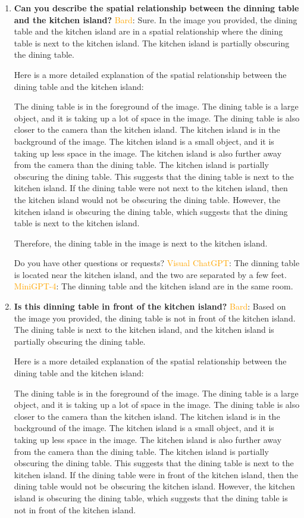 \begin{enumerate}
    \item \textbf{Can you describe the spatial relationship between the dinning table and the kitchen island?}
    \subitem \textcolor{orange}{Bard}: 
    Sure. In the image you provided, the dining table and the kitchen island are in a spatial relationship where the dining table is next to the kitchen island. The kitchen island is partially obscuring the dining table.
    
    Here is a more detailed explanation of the spatial relationship between the dining table and the kitchen island:
    
    The dining table is in the foreground of the image. The dining table is a large object, and it is taking up a lot of space in the image. The dining table is also closer to the camera than the kitchen island.
    The kitchen island is in the background of the image. The kitchen island is a small object, and it is taking up less space in the image. The kitchen island is also further away from the camera than the dining table.
    The kitchen island is partially obscuring the dining table. This suggests that the dining table is next to the kitchen island.
    If the dining table were not next to the kitchen island, then the kitchen island would not be obscuring the dining table. However, the kitchen island is obscuring the dining table, which suggests that the dining table is next to the kitchen island.
    
    Therefore, the dining table in the image is next to the kitchen island.
    
    Do you have other questions or requests?
    \subitem \textcolor{orange}{Visual ChatGPT}: The dinning table is located near the kitchen island, and the two are separated by a few feet.
    \subitem \textcolor{orange}{MiniGPT-4}: The dinning table and the kitchen island are in the same room.
    \item \textbf{Is this dinning table in front of the kitchen island?}
    \subitem \textcolor{orange}{Bard}: Based on the image you provided, the dining table is not in front of the kitchen island. The dining table is next to the kitchen island, and the kitchen island is partially obscuring the dining table.

    Here is a more detailed explanation of the spatial relationship between the dining table and the kitchen island:
    
    The dining table is in the foreground of the image. The dining table is a large object, and it is taking up a lot of space in the image. The dining table is also closer to the camera than the kitchen island.
    The kitchen island is in the background of the image. The kitchen island is a small object, and it is taking up less space in the image. The kitchen island is also further away from the camera than the dining table.
    The kitchen island is partially obscuring the dining table. This suggests that the dining table is next to the kitchen island.
    If the dining table were in front of the kitchen island, then the dining table would not be obscuring the kitchen island. However, the kitchen island is obscuring the dining table, which suggests that the dining table is not in front of the kitchen island.
    

\end{enumerate}
